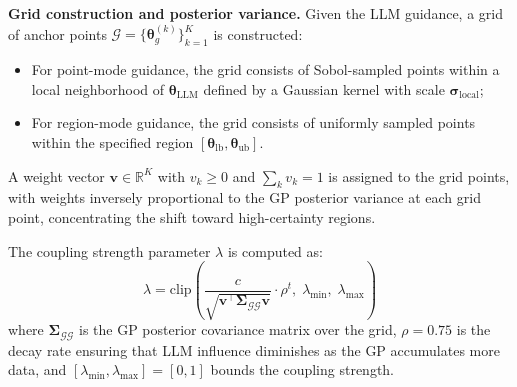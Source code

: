 \documentclass[lettersize,journal]{IEEEtran}
\begin{document}
\textbf{Grid construction and posterior variance.} Given the LLM guidance, a grid of anchor points $\mathcal{G} = \{\boldsymbol{\theta}_g^{(k)}\}_{k=1}^{K}$ is constructed:
\begin{itemize}
\item For point-mode guidance, the grid consists of Sobol-sampled points within a local neighborhood of $\boldsymbol{\theta}_{\text{LLM}}$ defined by a Gaussian kernel with scale $\boldsymbol{\sigma}_{\text{local}}$;
\item For region-mode guidance, the grid consists of uniformly sampled points within the specified region $[\boldsymbol{\theta}_{\text{lb}}, \boldsymbol{\theta}_{\text{ub}}]$.
\end{itemize}

A weight vector $\boldsymbol{v} \in \mathbb{R}^K$ with $v_k \geq 0$ and $\sum_k v_k = 1$ is assigned to the grid points, with weights inversely proportional to the GP posterior variance at each grid point, concentrating the shift toward high-certainty regions.

The coupling strength parameter $\lambda$ is computed as:
\begin{equation}
\label{eq:lambda}
\lambda = \text{clip}\!\left(\frac{c}{\sqrt{\boldsymbol{v}^\top \boldsymbol{\Sigma}_{\mathcal{G}\mathcal{G}} \boldsymbol{v}}} \cdot \rho^t, \; \lambda_{\min}, \; \lambda_{\max}\right)
\end{equation}
where $\boldsymbol{\Sigma}_{\mathcal{G}\mathcal{G}}$ is the GP posterior covariance matrix over the grid, $\rho = 0.75$ is the decay rate ensuring that LLM influence diminishes as the GP accumulates more data, and $[\lambda_{\min}, \lambda_{\max}] = [0, 1]$ bounds the coupling strength.
\end{document}
